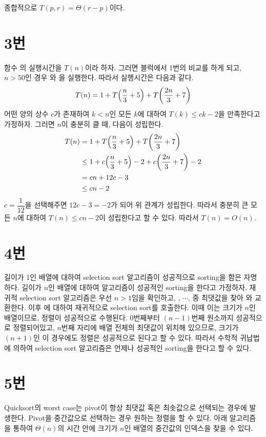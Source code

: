 \documentclass[10pt]{article}
\begin{document}
\vspace{3mm}
종합적으로 $T(p, r) = \Theta(r-p)$이다.

\section*{3번}
함수 의 실행시간을 $T(n)$이라 하자.
그러면  블럭에서 1번의 비교를 하게 되고, $n>50$인 경우 와 을 실행한다. 
따라서 실행시간은 다음과 같다.
$$T(n) = 1 + T\qty(\frac{n}{3}+5) + T\qty(\frac{2n}{3}+7)$$
어떤 양의 상수 $c$가 존재하여 $k<n$인 모든 $k$에 대하여 $T(k) \leq ck - 2$을 만족한다고 가정하자. 그러면 $n$이 충분히 클 때, 다음이 성립한다.
\begin{align*}
    T(n) &= 1 + T\qty(\frac{n}{3}+5) + T\qty(\frac{2n}{3}+7) \\
    &\leq 1 + c\qty(\frac{n}{3}+5) - 2 + c\qty(\frac{2n}{3}+7) - 2 \\
    &= cn + 12c - 3 \\
    &\leq cn - 2
\end{align*}
$c = \dfrac{1}{12}$을 선택해주면 $12c-3 = -2$가 되어 위 관계가 성립한다. 
따라서 충분히 큰 모든 $n$에 대하여 $T(n) \leq cn-2$이 성립한다고 할 수 있다. 따라서 $T(n) = O(n)$.

\section*{4번}
길이가 1인 배열에 대하여 selection sort 알고리즘이 성공적으로 sorting을 함은 자명하다. 
길이가 $n$인 배열에 대하여 알고리즘이 성공적인 sorting을 한다고 가정하자. 
재귀적 selection sort 알고리즘은 우선 $n > 1$임을 확인하고, , $\cdots$,  중 최댓값을 찾아 와 교환한다.
이후 에 대하여 재귀적으로 selection sort를 호출한다. 이때 이는 크기가 $n$인 배열이므로, 정렬이 성공적으로 수행된다.
$0$번째부터 $(n-1)$번째 원소까지 성공적으로 정렬되어있고, $n$번째 자리에 배열 전체의 최댓값이 위치해 있으므로, 크기가 $(n+1)$인 이 경우에도 정렬은 성공적으로 된다고 할 수 있다.
따라서 수학적 귀납법에 의하여 selection sort 알고리즘은 언제나 성공적인 sorting을 한다고 할 수 있다.

\section*{5번}
Quicksort의 worst case는 pivot이 항상 최댓값 혹은 최솟값으로 선택되는 경우에 발생한다. 
Pivot을 중간값으로 선택하는 경우 원하는 정렬을 할 수 있다. 
아래 알고리즘을 통하여 $\Theta(n)$의 시간 안에 크기가 $n$인 배열의 중간값의 인덱스을 찾을 수 있다.
\end{document}
